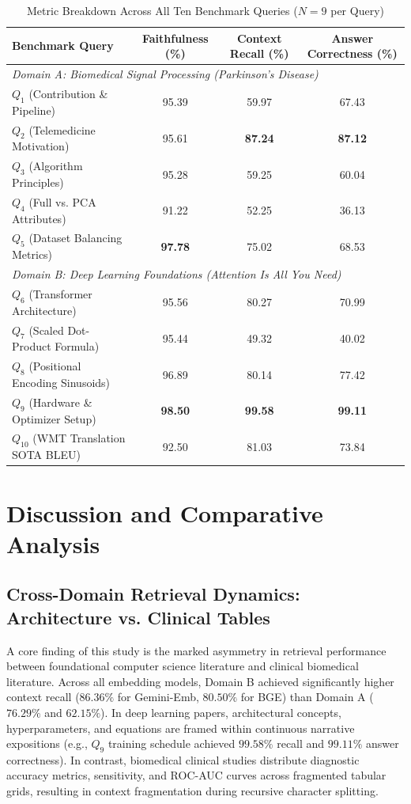 \documentclass[conference]{IEEEtran}
\begin{document}
\begin{table}[htbp]
\caption{Metric Breakdown Across All Ten Benchmark Queries ($N=9$ per Query)}
\label{tab:query_breakdown}
\centering
\begin{tabular}{lccc}
\toprule
\textbf{Benchmark Query} & \textbf{Faithfulness (\%)} & \textbf{Context Recall (\%)} & \textbf{Answer Correctness (\%)} \\
\midrule
\multicolumn{4}{l}{\textit{Domain A: Biomedical Signal Processing (Parkinson's Disease)}} \\
$Q_1$ (Contribution \& Pipeline) & 95.39 & 59.97 & 67.43 \\
$Q_2$ (Telemedicine Motivation) & 95.61 & \textbf{87.24} & \textbf{87.12} \\
$Q_3$ (Algorithm Principles) & 95.28 & 59.25 & 60.04 \\
$Q_4$ (Full vs. PCA Attributes) & 91.22 & 52.25 & 36.13 \\
$Q_5$ (Dataset Balancing Metrics) & \textbf{97.78} & 75.02 & 68.53 \\
\midrule
\multicolumn{4}{l}{\textit{Domain B: Deep Learning Foundations (Attention Is All You Need)}} \\
$Q_6$ (Transformer Architecture) & 95.56 & 80.27 & 70.99 \\
$Q_7$ (Scaled Dot-Product Formula) & 95.44 & 49.32 & 40.02 \\
$Q_8$ (Positional Encoding Sinusoids) & 96.89 & 80.14 & 77.42 \\
$Q_9$ (Hardware \& Optimizer Setup) & \textbf{98.50} & \textbf{99.58} & \textbf{99.11} \\
$Q_{10}$ (WMT Translation SOTA BLEU) & 92.50 & 81.03 & 73.84 \\
\bottomrule
\end{tabular}
\end{table}

\section{Discussion and Comparative Analysis}

\subsection{Cross-Domain Retrieval Dynamics: Architecture vs. Clinical Tables}
A core finding of this study is the marked asymmetry in retrieval performance between foundational computer science literature and clinical biomedical literature. Across all embedding models, Domain B achieved significantly higher context recall ($86.36\%$ for Gemini-Emb, $80.50\%$ for BGE) than Domain A ($76.29\%$ and $62.15\%$). In deep learning papers, architectural concepts, hyperparameters, and equations are framed within continuous narrative expositions (e.g., $Q_9$ training schedule achieved $99.58\%$ recall and $99.11\%$ answer correctness). In contrast, biomedical clinical studies distribute diagnostic accuracy metrics, sensitivity, and ROC-AUC curves across fragmented tabular grids, resulting in context fragmentation during recursive character splitting.
\end{document}

